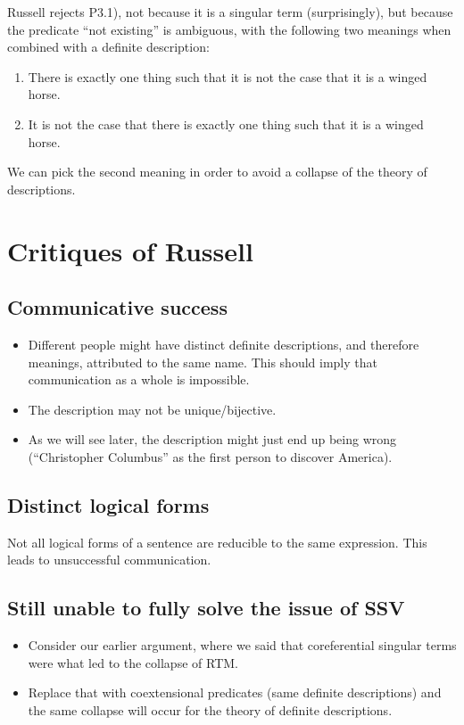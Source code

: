 Russell rejects P3.1), not because it is a singular term (surprisingly), but because the predicate ``not existing'' is ambiguous, with the following two meanings when combined with a definite description:
\begin{enumerate}
  \item There is exactly one thing such that it is not the case that it is a winged horse.
  \item It is not the case that there is exactly one thing such that it is a winged horse.
\end{enumerate}
We can pick the second meaning in order to avoid a collapse of the theory of descriptions.

\section{Critiques of Russell}

\subsection*{Communicative success}
\begin{itemize}
  \item Different people might have distinct definite descriptions, and therefore meanings, attributed to the same name. This should imply that communication as a whole is impossible.
  \item The description may not be unique/bijective.
  \item As we will see later, the description might just end up being wrong (``Christopher Columbus'' as the first person to discover America).
\end{itemize}

\subsection*{Distinct logical forms}
Not all logical forms of a sentence are reducible to the same expression. This leads to unsuccessful communication.

\subsection*{Still unable to fully solve the issue of SSV}
\begin{itemize}
  \item Consider our earlier argument, where we said that coreferential singular terms were what led to the collapse of RTM.
  \item Replace that with coextensional predicates (same definite descriptions) and the same collapse will occur for the theory of definite descriptions.
\end{itemize}

